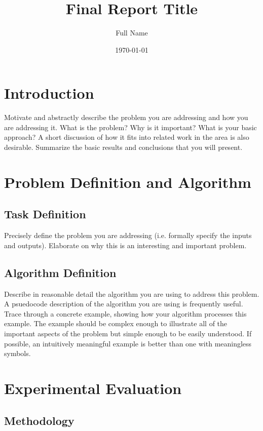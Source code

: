 \documentclass[11pt]{article}
\begin{document}
\title{Final Report Title}
\author{Full Name}
\date{\today}
\maketitle

\section{Introduction}

Motivate and abstractly describe the problem you are addressing and how you are addressing it. What is the problem? Why is it important? What is your basic approach? A short discussion of how it fits into related work in the area is also desirable. Summarize the basic results and conclusions that you will present. 

\section{Problem Definition and Algorithm}

\subsection{Task Definition}

Precisely define the problem you are addressing (i.e. formally specify the inputs and outputs). Elaborate on why this is an interesting and important problem. 

\subsection{Algorithm Definition}

Describe in reasonable detail the algorithm you are using to address this problem. A psuedocode description of the algorithm you are using is frequently useful. Trace through a concrete example, showing how your algorithm processes this example. The example should be complex enough to illustrate all of the important aspects of the problem but simple enough to be easily understood. If possible, an intuitively meaningful example is better than one with meaningless symbols. 

\section{Experimental Evaluation}

\subsection{Methodology}
\end{document}
